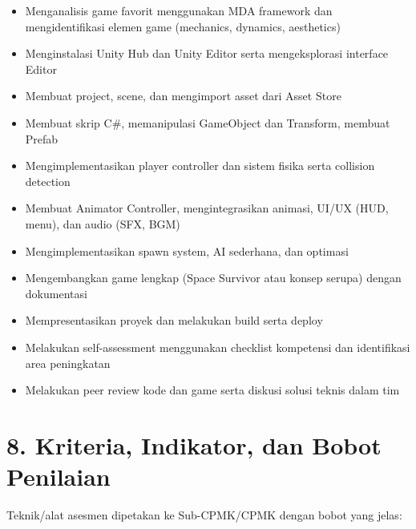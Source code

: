 \documentclass[12pt,a4paper]{article}
\begin{document}
\begin{itemize}[leftmargin=*]
  \item Menganalisis game favorit menggunakan MDA framework dan mengidentifikasi elemen game (mechanics, dynamics, aesthetics)
  \item Menginstalasi Unity Hub dan Unity Editor serta mengeksplorasi interface Editor
  \item Membuat project, scene, dan mengimport asset dari Asset Store
  \item Membuat skrip C\#, memanipulasi GameObject dan Transform, membuat Prefab
  \item Mengimplementasikan player controller dan sistem fisika serta collision detection
  \item Membuat Animator Controller, mengintegrasikan animasi, UI/UX (HUD, menu), dan audio (SFX, BGM)
  \item Mengimplementasikan spawn system, AI sederhana, dan optimasi
  \item Mengembangkan game lengkap (Space Survivor atau konsep serupa) dengan dokumentasi
  \item Mempresentasikan proyek dan melakukan build serta deploy
  \item Melakukan self-assessment menggunakan checklist kompetensi dan identifikasi area peningkatan
  \item Melakukan peer review kode dan game serta diskusi solusi teknis dalam tim
\end{itemize}

\vspace{0.5cm}

\section*{8. Kriteria, Indikator, dan Bobot Penilaian}

Teknik/alat asesmen dipetakan ke Sub-CPMK/CPMK dengan bobot yang jelas:
\end{document}

